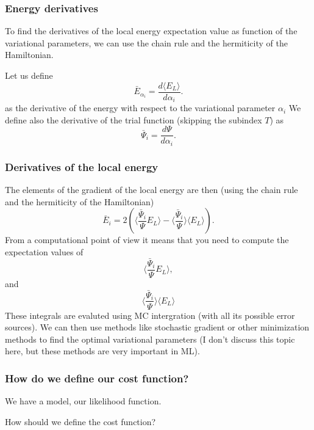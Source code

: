 \documentclass{beamer}
\begin{document}
\begin{frame}
\frametitle{Energy derivatives}

\begin{block}{}
To find the derivatives of the local energy expectation value as function of the variational parameters, we can use the chain rule and the hermiticity of the Hamiltonian.  

Let us define 
\[
\bar{E}_{\alpha_i}=\frac{d\langle  E_L\rangle}{d\alpha_i}.
\]
as the derivative of the energy with respect to the variational parameter $\alpha_i$
We define also the derivative of the trial function (skipping the subindex $T$) as 
\[
\bar{\Psi}_{i}=\frac{d\Psi}{d\alpha_i}.
\]
\end{block}
\end{frame}

\begin{frame}
\frametitle{Derivatives of the local energy}

\begin{block}{}
The elements of the gradient of the local energy are then (using the chain rule and the hermiticity of the Hamiltonian)
\[
\bar{E}_{i}= 2\left( \langle \frac{\bar{\Psi}_{i}}{\Psi}E_L\rangle -\langle \frac{\bar{\Psi}_{i}}{\Psi}\rangle\langle E_L \rangle\right).
\]
From a computational point of view it means that you need to compute the expectation values of 
\[
\langle \frac{\bar{\Psi}_{i}}{\Psi}E_L\rangle,
\]
and
\[
\langle \frac{\bar{\Psi}_{i}}{\Psi}\rangle\langle E_L\rangle
\]
These integrals are evaluted using MC intergration (with all its possible error sources). 
We can then use methods like stochastic gradient or other minimization methods to find the optimal variational parameters (I don't discuss this topic here, but these methods are very important in ML). 
\end{block}
\end{frame}

\begin{frame}
\frametitle{How do we define our cost function?}

\begin{block}{}
We have a model, our likelihood function. 

How should we define the cost function?

\end{block}
\end{frame}
\end{document}
